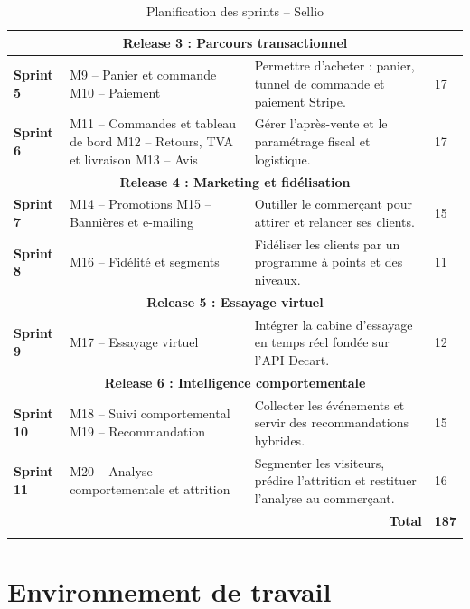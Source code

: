 \begin{longtable}{|p{1.6cm}|p{4.2cm}|p{6.5cm}|p{1.6cm}|}
\hline
\multicolumn{4}{|c|}{\textbf{Release 3 : Parcours transactionnel}} \\
\hline
\textbf{Sprint 5} & M9 -- Panier et commande \newline M10 -- Paiement & Permettre d'acheter : panier, tunnel de commande et paiement Stripe. & 17 \\
\hline
\textbf{Sprint 6} & M11 -- Commandes et tableau de bord \newline M12 -- Retours, TVA et livraison \newline M13 -- Avis & Gérer l'après-vente et le paramétrage fiscal et logistique. & 17 \\
\hline
\multicolumn{4}{|c|}{\textbf{Release 4 : Marketing et fidélisation}} \\
\hline
\textbf{Sprint 7} & M14 -- Promotions \newline M15 -- Bannières et e-mailing & Outiller le commerçant pour attirer et relancer ses clients. & 15 \\
\hline
\textbf{Sprint 8} & M16 -- Fidélité et segments & Fidéliser les clients par un programme à points et des niveaux. & 11 \\
\hline
\multicolumn{4}{|c|}{\textbf{Release 5 : Essayage virtuel}} \\
\hline
\textbf{Sprint 9} & M17 -- Essayage virtuel & Intégrer la cabine d'essayage en temps réel fondée sur l'API Decart. & 12 \\
\hline
\multicolumn{4}{|c|}{\textbf{Release 6 : Intelligence comportementale}} \\
\hline
\textbf{Sprint 10} & M18 -- Suivi comportemental \newline M19 -- Recommandation & Collecter les événements et servir des recommandations hybrides. & 15 \\
\hline
\textbf{Sprint 11} & M20 -- Analyse comportementale et attrition & Segmenter les visiteurs, prédire l'attrition et restituer l'analyse au commerçant. & 16 \\
\hline
\multicolumn{3}{|r|}{\textbf{Total}} & \textbf{187} \\
\hline
\caption{Planification des sprints -- Sellio}
\label{tab:planification-sprints}
\end{longtable}

\section{Environnement de travail}
